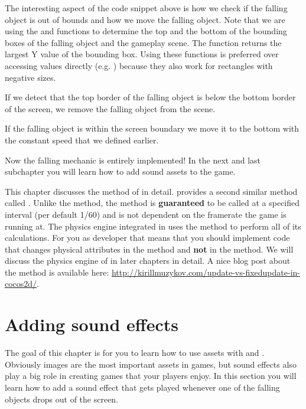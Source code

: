 The interesting aspect of the code snippet above is how we check if the
falling object is out of bounds and how we move the falling object. Note that we
are using the  and 
functions to determine the top and the bottom of the bounding boxes of the
falling object and the gameplay scene. The  function
returns the largest Y value of the bounding box. Using these functions is preferred over accessing values
directly (e.g. ) because they
also work for rectangles with negative sizes.

If we detect that the top border of the falling object is below the bottom
border of the screen, we remove the falling object from the scene.

If the falling object is within the screen boundary we move it to the bottom
with the constant speed that we defined earlier.

Now the falling mechanic is entirely implemented! In the next and last
subchapter you will learn how to add sound assets to the game.

\begin{details}[frametitle={Update vs. Fixed Update}] 
This chapter discusses the  method of \cocos{} in detail.
\cocos{} provides a second similar method called
.
Unlike the  method, the  method is
\textbf{guaranteed} to be called at a specified interval (per default 1/60) and
is not dependent on the framerate the game is running at. The physics engine
integrated in \cocos{} uses the
 method to perform all of its calculations. For you as
developer that means that you should implement code that changes physical
attributes in the  method and \textbf{not} in the
 method. We will discuss the physics engine of \cocos{} in
later chapters in detail. A nice blog post about the 
method is available here:
\url{http://kirillmuzykov.com/update-vs-fixedupdate-in-cocos2d/}.
\end{details}

\section{Adding sound effects}
The goal of this chapter is for you to learn how to use assets with \SB{} and
\cocos{}. Obviously images are the most important assets in games, but sound
effects also play a big role in creating games that your players enjoy. In this
section you will learn how to add a sound effect that gets played whenever one
of the falling objects drops out of the screen.

